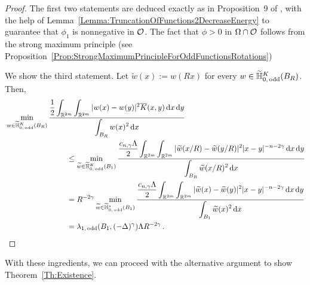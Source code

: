 \begin{proof}
The first two statements are deduced exactly as in Proposition~9 of \cite{ServadeiValdinoci}, with the help of Lemma~\ref{Lemma:TruncationOfFunctions2DecreaseEnergy} to guarantee that $\phi_1$ is nonnegative in $\mathcal{O}$. The fact that $\phi > 0$ in $\Omega \cap \mathcal{O}$ follows from the strong maximum principle (see Proposition~\ref{Prop:StrongMaximumPrincipleForOddFunctionsRotations})

We show the third statement. Let $\widetilde{w} (x):= w(Rx)$ for every $w\in \widetilde{\mathbb{H}}^K_{0, \, \mathrm{odd}}(B_R)$. Then,
\begin{align*}
 & \min_{w \in \widetilde{\mathbb{H}}^K_{0, \, \mathrm{odd}}(B_R)} \dfrac{\dfrac{1}{2}  \displaystyle\int_{\mathbb{R}^{2m}} \int_{\mathbb{R}^{2m}} |w(x) - w(y)|^2 \overline{K}(x,y) \,\mathrm{d} x \,\mathrm{d} y}{ \displaystyle \int_{B_R} w(x)^2 \,\mathrm{d} x} \quad \quad \quad \quad \quad \quad \quad \quad \quad \quad \quad \quad\\
 &  \quad \quad \quad \quad \quad \quad \quad \quad \leq \min_{\widetilde{w} \in \widetilde{\mathbb{H}}^K_{0, \, \mathrm{odd}}(B_1)} \dfrac{\dfrac{c_{n, \gamma}\Lambda}{2}  \displaystyle\int_{\mathbb{R}^{2m}} \int_{\mathbb{R}^{2m}} |\widetilde{w}(x/R) - \widetilde{w}(y/R)|^2 |x - y|^{-n-2 \gamma}\,\mathrm{d} x \,\mathrm{d} y}{ \displaystyle \int_{B_R} \widetilde{w}(x/R)^2 \,\mathrm{d} x}
\\
& \quad \quad \quad \quad \quad \quad \quad \quad = R^{-2 \gamma }\min_{\widetilde{w} \in \widetilde{\mathbb{H}}^s_{0, \, \mathrm{odd}}(B_1)} \dfrac{\dfrac{c_{n, \gamma}\Lambda}{2}  \displaystyle\int_{\mathbb{R}^{2m}} \int_{\mathbb{R}^{2m}} |\widetilde{w}(x) - \widetilde{w}(y)|^2 |x - y|^{-n-2 \gamma}\,\mathrm{d} x \,\mathrm{d} y}{ \displaystyle \int_{B_1} \widetilde{w}(x)^2 \,\mathrm{d} x}
\\
& \quad \quad \quad \quad \quad \quad \quad \quad = \lambda_{1, \, \mathrm{odd}}(B_1, (-\Delta)^\gamma) \Lambda R^{-2 \gamma } \,.
\end{align*}
\end{proof}


With these ingredients, we can proceed with the alternative argument to show Theorem~\ref{Th:Existence}.

